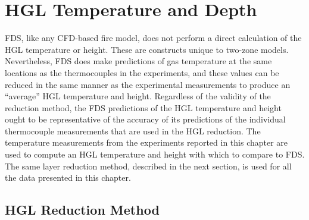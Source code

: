 
\chapter{HGL Temperature and Depth}

\label{HGL:Chapter}

FDS, like any CFD-based fire model, does not perform a direct calculation of the HGL temperature or height. These are constructs unique to two-zone models. Nevertheless, FDS does make predictions of gas temperature at the same locations as the thermocouples in the experiments, and these values can be reduced in the same manner as the experimental measurements to produce an ``average'' HGL temperature and height.  Regardless of the validity of the reduction method, the FDS predictions of the HGL temperature and height ought to be representative of the accuracy of its predictions of the individual thermocouple measurements that are used in the HGL reduction. The temperature measurements from the experiments reported in this chapter are used to compute an HGL temperature and height with which to compare to FDS.  The same layer reduction method, described in the next section, is used for all the data presented in this chapter.


\section{HGL Reduction Method}
\label{HGL_Reduction}

